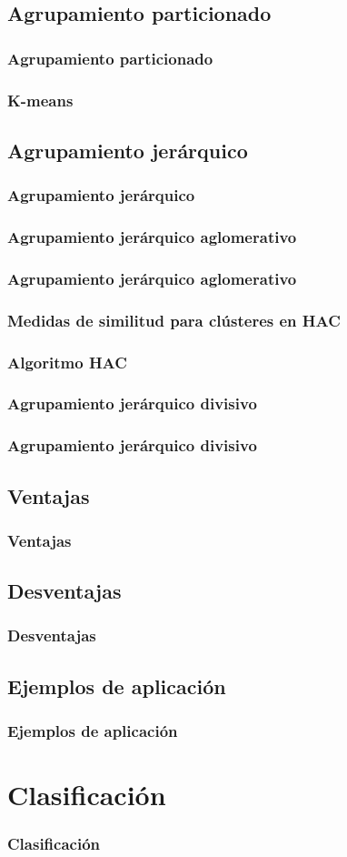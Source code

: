 \documentclass[t,compress,10pt,xcolor=dvipsnames]{beamer}
\begin{document}
	\subsection{Agrupamiento particionado}
	\frame
	{
		\frametitle{Agrupamiento particionado}
	}
	
	\frame
	{
		\frametitle{K-means}
	}

	\subsection{Agrupamiento jer\'arquico}
	\frame
	{
		\frametitle{Agrupamiento jer\'arquico}
	}
	
	
	\subsubsection{Agrupamiento jer\'arquico aglomerativo}
	\frame
	{
		\frametitle{Agrupamiento jer\'arquico aglomerativo}
	}

	\frame
	{
		\frametitle{Medidas de similitud para cl\'usteres en HAC}
	}	
	
	\frame
	{
		\frametitle{Algoritmo HAC}
	}	

	\subsubsection{Agrupamiento jer\'arquico divisivo}
	\frame
	{
		\frametitle{Agrupamiento jer\'arquico divisivo}
	}

	\subsection{Ventajas}
	\frame
	{
		\frametitle{Ventajas}
	}

	\subsection{Desventajas}
	\frame
	{
		\frametitle{Desventajas}
	}

	\subsection{Ejemplos de aplicaci\'on}
	\frame
	{
		\frametitle{Ejemplos de aplicaci\'on}
	}

	\section{Clasificaci\'on}
	\frame
	{
		\frametitle{Clasificaci\'on}
	}
	
\end{document}
